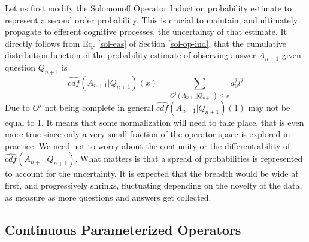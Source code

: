 \documentclass[runningheads]{llncs}
\begin{document}
Let us first modify the Solomonoff Operator Induction probability
estimate to represent a second order probability. This is crucial to
maintain, and ultimately propagate to efferent cognitive processes,
the uncertainty of that estimate.
It directly follows from Eq. \ref{sol-eas} of Section
\ref{sol-op-ind}, that the cumulative distribution function of the
probability estimate of observing answer $A_{n+1}$ given question
$Q_{n+1}$ is
\begin{equation}
  \label{sol-cdf}
\hat{cdf}(A_{n+1}|Q_{n+1})(x) = \sum_{O^j(A_{n+1}|Q_{n+1}) \le x} a_0^j l^j
\end{equation}
Due to $O^j$ not being complete in general
$\hat{cdf}(A_{n+1}|Q_{n+1})(1)$ may not be equal to 1. It means that
some normalization will need to take place, that is even more true
since only a very small fraction of the operator space is explored in
practice. We need not to worry about the continuity or the
differentiability of $\hat{cdf}(A_{n+1}|Q_{n+1})$. What matters is
that a spread of probabilities is represented to account for the
uncertainty. It is expected that the breadth would be wide at first,
and progressively shrinks, fluctuating depending on the novelty of the
data, as measure as more questions and answers get collected.

\subsection{Continuous Parameterized Operators}


\end{document}
